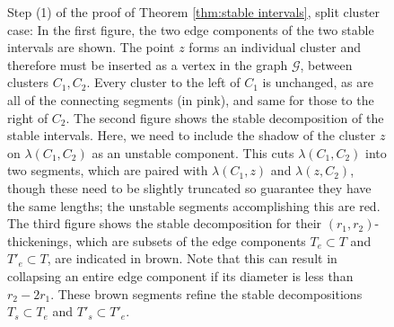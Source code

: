 \documentclass[10pt,a4paper]{amsart}
\newcommand{\calG}{\mathcal{G}}
\begin{document}
\begin{figure}[b]
    \centering
    
    \caption{Step (1) of the proof of Theorem \ref{thm:stable intervals}, split cluster case:  In the first figure, the two edge components of the two stable intervals are shown.  The point $z$ forms an individual cluster and therefore must be inserted as a vertex in the graph $\calG$, between clusters $C_1, C_2$.  Every cluster to the left of $C_1$ is unchanged, as are all of the connecting segments (in pink), and same for those to the right of $C_2$.  The second figure shows the stable decomposition of the stable intervals.  Here, we need to include the shadow of the cluster $z$ on $\lambda(C_1,C_2)$ as an unstable component.  This cuts $\lambda(C_1,C_2)$ into two segments, which are paired with $\lambda(C_1,z)$ and $\lambda(z,C_2)$, though these need to be slightly truncated so guarantee they have the same lengths; the unstable segments accomplishing this are red.  The third figure shows the stable decomposition for their $(r_1,r_2)$-thickenings, which are subsets of the edge components $T_e \subset T$ and $T'_e \subset T$, are indicated in brown.  Note that this can result in collapsing an entire edge component if its diameter is less than $r_2-2r_1$.  These brown segments refine the stable decompositions $T_s \subset T_e$ and $T'_s \subset T'_e$.}    \label{fig:split cluster}
\end{figure}
\end{document}
